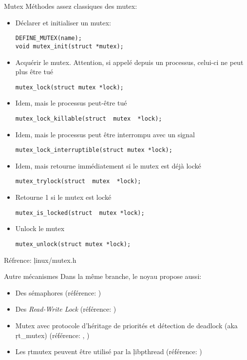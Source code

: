 \begin{frame}[fragile=singleslide]{Mutex}
  Méthodes assez classiques des mutex:
  \begin{itemize}
  \item Déclarer et initialiser un mutex:
    \begin{lstlisting} 
DEFINE_MUTEX(name);
void mutex_init(struct *mutex);
    \end{lstlisting} 
  \item  Acquérir   le  mutex.  Attention,  si   appelé  depuis  un
    processus,     celui-ci     ne      peut     plus     être     tué
    \begin{lstlisting} 
mutex_lock(struct mutex *lock);
    \end{lstlisting} 
  \item Idem, mais le processus peut-être tué
    \begin{lstlisting} 
mutex_lock_killable(struct  mutex  *lock);
    \end{lstlisting} 
  \item Idem, mais le processus peut être interrompu avec un signal
    \begin{lstlisting} 
mutex_lock_interruptible(struct mutex *lock);
    \end{lstlisting} 
  \item Idem, mais retourne immédiatement si le mutex est déjà locké
    \begin{lstlisting} 
mutex_trylock(struct  mutex  *lock); 
    \end{lstlisting} 
  \item Retourne 1 si le mutex est locké
    \begin{lstlisting} 
mutex_is_locked(struct  mutex *lock);
    \end{lstlisting} 
  \item  Unlock le mutex
    \begin{lstlisting} 
mutex_unlock(struct mutex *lock);
    \end{lstlisting} 
  \end{itemize}
  Réfrence: \c{linux/mutex.h}
\end{frame} 

\begin{frame}[fragile=singleslide]{Autre mécanismes}
Dans la même branche, le noyau propose aussi:
\begin{itemize} 
\item Des sémaphores (référence: )
\item Des \emph{Read-Write Lock} (référence: )
\item  Mutex avec protocole  d'héritage de  priorités et  détection de
  deadlock           (aka           \c{rt_mutex})          (référence:
  , )
\item  Les   \c{rtmutex}  peuvent  être  utilisé   par  la  \c{libpthread}
  (référence:                         
  )
\end{itemize} 
\end{frame} 

